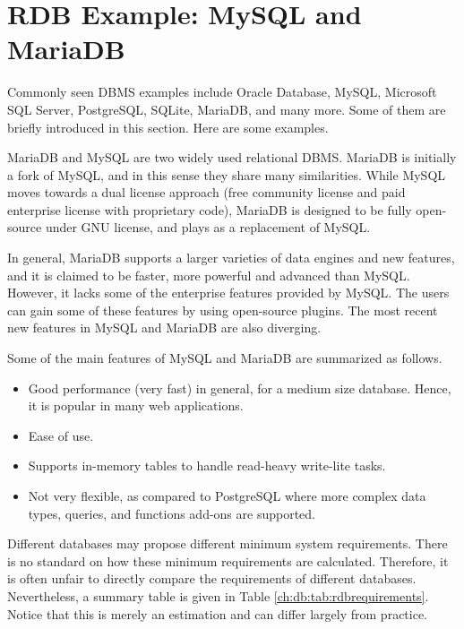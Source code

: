 \section{RDB Example: MySQL and MariaDB} \label{ch:db:sec:mariadb}

Commonly seen DBMS examples include Oracle Database, MySQL, Microsoft SQL Server, PostgreSQL, SQLite, MariaDB, and many more. Some of them are briefly introduced in this section. Here are some examples.

MariaDB and MySQL are two widely used relational DBMS. MariaDB is initially a fork of MySQL, and in this sense they share many similarities. While MySQL moves towards a dual license approach (free community license and paid enterprise license with proprietary code), MariaDB is designed to be fully open-source under GNU license, and plays as a replacement of MySQL.

In general, MariaDB supports a larger varieties of data engines and new features, and it is claimed to be faster, more powerful and advanced than MySQL. However, it lacks some of the enterprise features provided by MySQL. The users can gain some of these features by using open-source plugins. The most recent new features in MySQL and MariaDB are also diverging.

Some of the main features of MySQL and MariaDB are summarized as follows.
\begin{itemize}
	\item Good performance (very fast) in general, for a medium size database. Hence, it is popular in many web applications.
	\item Ease of use.
	\item Supports in-memory tables to handle read-heavy write-lite tasks.
	\item Not very flexible, as compared to PostgreSQL where more complex data types, queries, and functions add-ons are supported.
\end{itemize}

Different databases may propose different minimum system requirements. There is no standard on how these minimum requirements are calculated. Therefore, it is often unfair to directly compare the requirements of different databases. Nevertheless, a summary table is given in Table \ref{ch:db:tab:rdbrequirements}. Notice that this is merely an estimation and can differ largely from practice.

